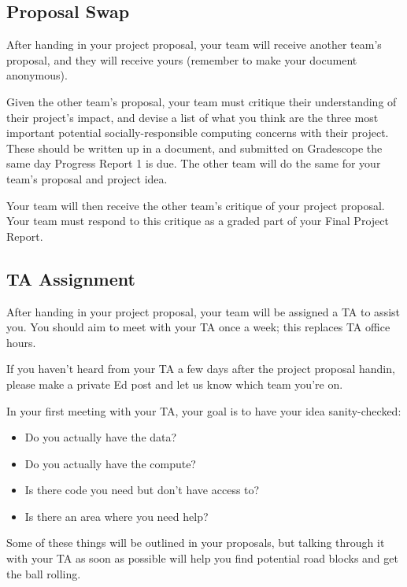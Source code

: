 \subsection*{Proposal Swap}

After handing in your project proposal, your team will receive another team's proposal, and they will receive yours (remember to make your document anonymous).

Given the other team's proposal, your team must critique their understanding of their project's impact, and devise a list of what you think are the three most important potential socially-responsible computing concerns with their project. These should be written up in a document, and submitted on Gradescope the same day Progress Report 1 is due. The other team will do the same for your team's proposal and project idea.

Your team will then receive the other team's critique of your project proposal. 
Your team must respond to this critique as a graded part of your Final Project Report.

\subsection*{TA Assignment}

After handing in your project proposal, your team will be assigned a TA to assist you.
You should aim to meet with your TA once a week; this replaces TA office hours.

If you haven't heard from your TA a few days after the project proposal handin, please make a private Ed post and let us know which team you're on.

In your first meeting with your TA, your goal is to have your idea sanity-checked:

\begin{itemize}
  \item Do you actually have the data?
  \item Do you actually have the compute?
  \item Is there code you need but don't have access to?
  \item Is there an area where you need help?
\end{itemize}

Some of these things will be outlined in your proposals, but talking through it with your TA as soon as possible will help you find potential road blocks and get the ball rolling.

